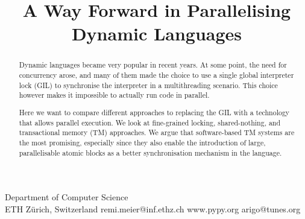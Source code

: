 \documentclass{sigplanconf}
\begin{document}
\setlength{\pdfpageheight}{\paperheight}
\setlength{\pdfpagewidth}{\paperwidth}






\title{A Way Forward in Parallelising Dynamic Languages}

           {Department of Computer Science\\ ETH Zürich, Switzerland}
           {remi.meier@inf.ethz.ch}
           {www.pypy.org}
           {arigo@tunes.org}

\maketitle

\begin{abstract}
  Dynamic languages became very popular in recent years. At some
  point, the need for concurrency arose, and many of them made the
  choice to use a single global interpreter lock (GIL) to synchronise
  the interpreter in a multithreading scenario. This choice however
  makes it impossible to actually run code in parallel.

  Here we want to compare different approaches to replacing the GIL
  with a technology that allows parallel execution. We look at
  fine-grained locking, shared-nothing, and transactional memory (TM)
  approaches. We argue that software-based TM systems are the most
  promising, especially since they also enable the introduction of
  large, parallelisable atomic blocks as a better synchronisation
  mechanism in the language.
\end{abstract}
\end{document}
